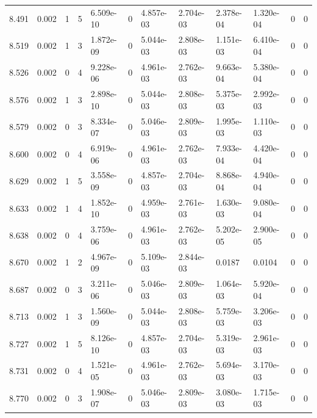 \documentclass[preview]{standalone}
\begin{document}
{{{{{{{{{{{\begin{tabular}{L{1.2cm}C{1.2cm} C{0.3cm}C{0.5cm} C{1.4cm}C{1.4cm} C{1.4cm}C{1.4cm} C{1.6cm}C{1.6cm} C{1.6cm}C{1.6cm}}
  8.491  &  0.002  & 1     &  5 &  6.509e-10  & 0  &  4.857e-03&   2.704e-03& 2.378e-04 & 1.320e-04   &  0 & 0  \\ 
  8.519  &  0.002  & 1     &  3 &  1.872e-09  & 0  &  5.044e-03&   2.808e-03& 1.151e-03 & 6.410e-04   &  0 & 0  \\ 
  8.526  &  0.002  & 0     &  4 &  9.228e-06  & 0  &  4.961e-03&   2.762e-03& 9.663e-04 & 5.380e-04   &  0 & 0  \\ 
  8.576  &  0.002  & 1     &  3 &  2.898e-10  & 0  &  5.044e-03&   2.808e-03& 5.375e-03 & 2.992e-03   &  0 & 0  \\ 
  8.579  &  0.002  & 0     &  3 &  8.334e-07  & 0  &  5.046e-03&   2.809e-03& 1.995e-03 & 1.110e-03   &  0 & 0  \\ 
  8.600  &  0.002  & 0     &  4 &  6.919e-06  & 0  &  4.961e-03&   2.762e-03& 7.933e-04 & 4.420e-04   &  0 & 0  \\ 
  8.629  &  0.002  & 1     &  5 &  3.558e-09  & 0  &  4.857e-03&   2.704e-03& 8.868e-04 & 4.940e-04   &  0 & 0  \\ 
  8.633  &  0.002  & 1     &  4 &  1.852e-10  & 0  &  4.959e-03&   2.761e-03& 1.630e-03 & 9.080e-04   &  0 & 0  \\ 
  8.638  &  0.002  & 0     &  4 &  3.759e-06  & 0  &  4.961e-03&   2.762e-03& 5.202e-05 & 2.900e-05   &  0 & 0  \\ 
  8.670  &  0.002  & 1     &  2 &  4.967e-09  & 0  &  5.109e-03&   2.844e-03& 0.0187 & 0.0104   &  0 & 0  \\ 
  8.687  &  0.002  & 0     &  3 &  3.211e-06  & 0  &  5.046e-03&   2.809e-03& 1.064e-03 & 5.920e-04   &  0 & 0  \\ 
  8.713  &  0.002  & 1     &  3 &  1.560e-09  & 0  &  5.044e-03&   2.808e-03& 5.759e-03 & 3.206e-03   &  0 & 0  \\ 
  8.727  &  0.002  & 1     &  5 &  8.126e-10  & 0  &  4.857e-03&   2.704e-03& 5.319e-03 & 2.961e-03   &  0 & 0  \\ 
  8.731  &  0.002  & 0     &  4 &  1.521e-05  & 0  &  4.961e-03&   2.762e-03& 5.694e-03 & 3.170e-03   &  0 & 0  \\ 
  8.770  &  0.002  & 0     &  3 &  1.908e-07  & 0  &  5.046e-03&   2.809e-03& 3.080e-03 & 1.715e-03   &  0 & 0  \\ 
\hline 
\end{tabular} 

}}}}}}}}}}}
\end{document}
